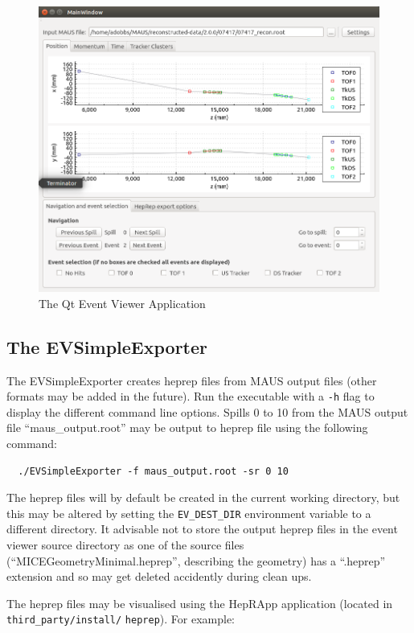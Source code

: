 \documentclass[a4paper,10pt]{article}
\begin{document}
\begin{figure}[hbt]
  \begin{center}
    \includegraphics[width=0.8\linewidth]{./graphics/QtEventViewer.png}
    \caption{The Qt Event Viewer Application}
    \label{fig:QtEventViewer}
  \end{center}
\end{figure}

\subsection{The EVSimpleExporter}
The EVSimpleExporter creates heprep files from MAUS output files (other formats may be added in the future). Run the executable with a \texttt{-h} flag to display the different command line options. Spills 0 to 10 from the MAUS output file ``maus\_output.root'' may be output to heprep file using the following command:

 \begin{lstlisting}
  ./EVSimpleExporter -f maus_output.root -sr 0 10
 \end{lstlisting}

The heprep files will by default be created in the current working directory, but this may be altered by setting the \texttt{EV\_DEST\_DIR} environment variable to a different directory. It advisable not to store the output heprep files in the event viewer source directory as one of the source files (``MICEGeometryMinimal.heprep'', describing the geometry) has a ``.heprep'' extension and so may get deleted accidently during clean ups. 

The heprep files may be visualised using the HepRApp application (located in \texttt{third\_party/install/} \texttt{heprep}). For example:
\end{document}
